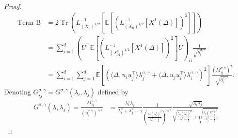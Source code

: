 \documentclass[11pt]{article}
\newcommand{\tr}[1]{\operatorname{Tr}\left({#1}\right)}
\newcommand{\EE}{\mathbb{E}}
\begin{document}
\begin{proof}
\begin{align*}
\text{Term B} &=  2 \tr{L_{(X_0)^{1/2}}^{-1}\left[ \EE \left[\left(L_{(X_0)^{1/2}}^{-1}[X^1(\Delta)]\right)^2 \right]\right]} \\
&= \sum_{i=1}^d  \left( U^\top \EE \left[ \left(L_{(X^0_A)^{1/2}}^{-1}[X^1(\Delta)]\right)^2 \right] U \right)_{ii} \frac{1}{\sqrt{\eta^{\sigma, \gamma}_i}} \\
&= \sum_{i=1}^d \sum_{j=1}^d \EE\left[ \left(  \langle \Delta, u_iu_j^\top \rangle \lambda^{\sigma, \gamma}_j  + \langle \Delta, u_ju_i^\top \rangle \lambda^{\sigma, \gamma}_i \right)^2 \right]  \frac{(M^{\sigma, \gamma}_{ij})^2}{ \sqrt{\eta^{\sigma, \gamma}_i}} .
\end{align*}
Denoting $G^{\sigma, \gamma}_{ij} = G^{\sigma, \gamma}(\lambda_i, \lambda_j)$ defined by
\begin{align} \label{eq:G_ij}
G^{\sigma, \gamma}(\lambda, \lambda_j) =\frac{M^{\sigma, \gamma}_{ij}}{ (\eta^{\sigma, \gamma}_i)^{1/4}} 
    &= \frac{\lambda^\sigma_i \lambda^\sigma_j}{\lambda^\sigma_i + \lambda^\sigma_j - \gamma} \frac{1}{ \left(\frac{\lambda_i (\lambda^\sigma_i)^2}{\lambda^\sigma_i - \frac{\gamma}{2}}\right)^{1/4}} \frac{ \sqrt{\lambda_i \lambda_j}}{ \sqrt{\frac{\lambda_i (\lambda^\sigma_i)^2}{\lambda^\sigma_i - \frac{\gamma}{2}}} + \sqrt{\frac{\lambda_i (\lambda^\sigma_j)^2}{\lambda^\sigma_j - \frac{\gamma}{2}}}}
\end{align}


\end{proof}
\end{document}
